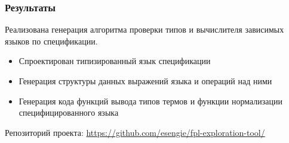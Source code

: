 
\begin{frame}
\frametitle{Результаты}
Реализована генерация алгоритма проверки типов и вычислителя зависимых языков по спецификации.
\begin{itemize}
\item Спроектирован типизированный язык спецификации
\item Генерация структуры данных выражений языка и операций над ними
\item Генерация кода функций вывода типов термов и функции нормализации специфицированного языка
\end{itemize}

Репозиторий проекта: \url{https://github.com/esengie/fpl-exploration-tool/}
\end{frame}

%
%
